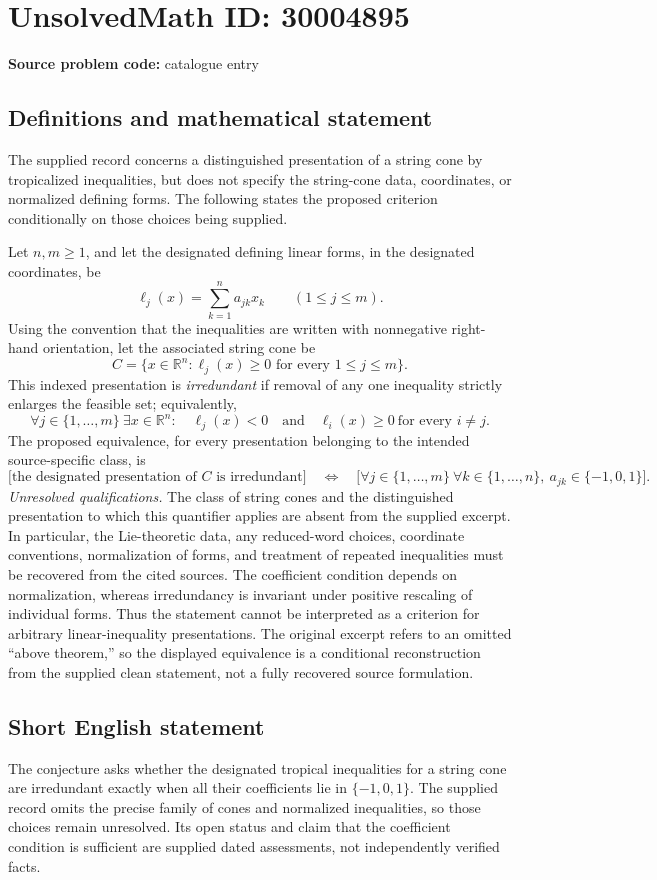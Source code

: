 \documentclass[11pt]{article}
\newcommand{\R}{\mathbb{R}}
\begin{document}
\section*{UnsolvedMath ID: 30004895}
\textbf{Source problem code:} catalogue entry
\subsection{Definitions and mathematical statement}
The supplied record concerns a distinguished presentation of a string cone by tropicalized inequalities, but does not specify the string-cone data, coordinates, or normalized defining forms. The following states the proposed criterion conditionally on those choices being supplied.

Let \(n,m\geq 1\), and let the designated defining linear forms, in the designated coordinates, be
\[
\ell_j(x)=\sum_{k=1}^{n}a_{jk}x_k\qquad (1\leq j\leq m).
\]
Using the convention that the inequalities are written with nonnegative right-hand orientation, let the associated string cone be
\[
C=\{x\in\R^n:\ell_j(x)\geq 0\text{ for every }1\leq j\leq m\}.
\]
This indexed presentation is \emph{irredundant} if removal of any one inequality strictly enlarges the feasible set; equivalently,
\[
\forall j\in\{1,\ldots,m\}\ \exists x\in\R^n:
\quad \ell_j(x)<0
\quad\text{and}\quad
\ell_i(x)\geq 0\ \text{for every }i\ne j.
\]
The proposed equivalence, for every presentation belonging to the intended source-specific class, is
\[
\bigl[\text{the designated presentation of }C\text{ is irredundant}\bigr]
\quad\Longleftrightarrow\quad
\bigl[\forall j\in\{1,\ldots,m\}\ \forall k\in\{1,\ldots,n\},\ a_{jk}\in\{-1,0,1\}\bigr].
\]
\emph{Unresolved qualifications.} The class of string cones and the distinguished presentation to which this quantifier applies are absent from the supplied excerpt. In particular, the Lie-theoretic data, any reduced-word choices, coordinate conventions, normalization of forms, and treatment of repeated inequalities must be recovered from the cited sources. The coefficient condition depends on normalization, whereas irredundancy is invariant under positive rescaling of individual forms. Thus the statement cannot be interpreted as a criterion for arbitrary linear-inequality presentations. The original excerpt refers to an omitted ``above theorem,'' so the displayed equivalence is a conditional reconstruction from the supplied clean statement, not a fully recovered source formulation.
\subsection{Short English statement}
The conjecture asks whether the designated tropical inequalities for a string cone are irredundant exactly when all their coefficients lie in \(\{-1,0,1\}\). The supplied record omits the precise family of cones and normalized inequalities, so those choices remain unresolved. Its open status and claim that the coefficient condition is sufficient are supplied dated assessments, not independently verified facts.
\end{document}

